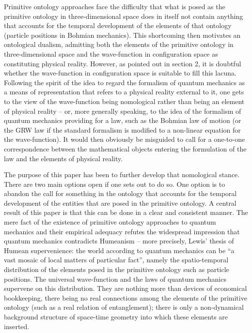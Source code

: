 \documentclass[12pt]{article}
\theoremstyle{definition}
\begin{document}
Primitive ontology approaches face the difficulty that what is posed as the primitive ontology in three-dimensional space does in itself not contain anything that accounts for the temporal development of the elements of that ontology (particle positions in Bohmian mechanics). This shortcoming then motivates an ontological dualism, admitting both the elements of the primitive ontology in three-dimensional space and the wave-function in configuration space as constituting physical reality. However, as pointed out in section 2, it is doubtful whether the wave-function in configuration space is suitable to fill this lacuna. Following the spirit of the idea to regard the formalism of quantum mechanics as a means of representation that refers to a physical reality external to it, one gets to the view of the wave-function being nomological rather than being an element of physical reality -- or, more generally speaking, to the idea of the formalism of quantum mechanics providing for a law, such as the Bohmian law of motion (or the GRW law if the standard formalism is modified to a non-linear equation for the wave-function). It would then obviously be misguided to call for a one-to-one correspondence between the mathematical objects entering the formulation of the law and the elements of physical reality.

The purpose of this paper has been to further develop that nomological stance. There are two main options open if one sets out to do so. One option is to abandon the call for something in the ontology that accounts for the temporal development of the entities that are posed in the primitive ontology. A central result of this paper is that this can be done in a clear and consistent manner. The mere fact of the existence of primitive ontology approaches to quantum mechanics and their empirical adequacy refutes the widespread impression that quantum mechanics contradicts Humeanism -- more precisely, Lewis' thesis of Humean supervenience: the world according to quantum mechanics can be ``a vast mosaic of local matters of particular fact'', namely the spatio-temporal distribution of the elements posed in the primitive ontology such as particle positions. The universal wave-function and the laws of quantum mechanics supervene on this distribution. They are nothing more than devices of economical bookkeeping, there being no real connections among the elements of the primitive ontology (such as a real relation of entanglement); there is only a non-dynamical background structure of space-time geometry into which these elements are inserted.
\end{document}
